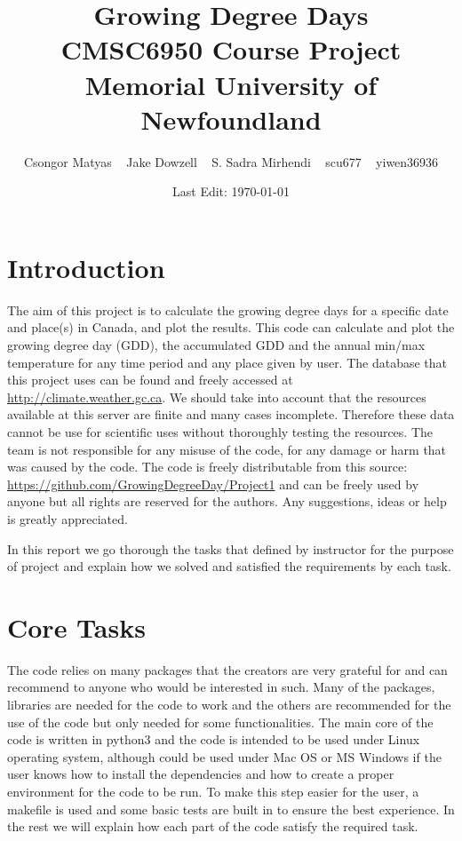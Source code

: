 \documentclass[11pt,letterpaper]{article}
\begin{document}
\title{Growing Degree Days\\CMSC6950 Course Project \\ \vspace{0.3cm}
\large{Memorial University of Newfoundland} }
\author{Csongor Matyas ~ Jake Dowzell ~ S. Sadra Mirhendi ~ scu677 ~ yiwen36936}
\date{Last Edit: \today}
\maketitle
\section{Introduction}
The aim of this project is to calculate the growing degree days for a specific date and place(s) in Canada, and plot the results. This code can calculate and plot the growing degree day (GDD), the accumulated GDD and the annual min/max temperature for any time period and any place given by user. The database that this project uses can be found and freely accessed at \url{http://climate.weather.gc.ca}. We should take into account that the resources available at this server are finite and many cases incomplete. Therefore these data cannot be use for scientific uses without thoroughly testing the resources. The team is not responsible for any misuse of the code, for any damage or harm that was caused by the code. The code is freely distributable from this source: \url{https://github.com/GrowingDegreeDay/Project1} and can be freely used by anyone but all rights are reserved for the authors. Any suggestions, ideas or help is greatly appreciated.

In this report we go thorough the tasks that defined by instructor for the purpose of project and explain how we solved and satisfied the requirements by each task.

\section{Core Tasks}
The code relies on many packages that the creators are very grateful for and can recommend to anyone who would be interested in such. Many of the packages, libraries are needed for the code to work and the others are recommended for the use of the code but only needed for some functionalities. The main core of the code is written in python3 and the code is intended to be used under Linux operating system, although could be used under Mac OS or MS Windows if the user knows how to install the dependencies and how to create a proper environment for the code to be run. To make this step easier for the user, a makefile is used and some basic tests are built in to ensure the best experience. In the rest we will explain how each part of the code satisfy the required task. 
\end{document}
